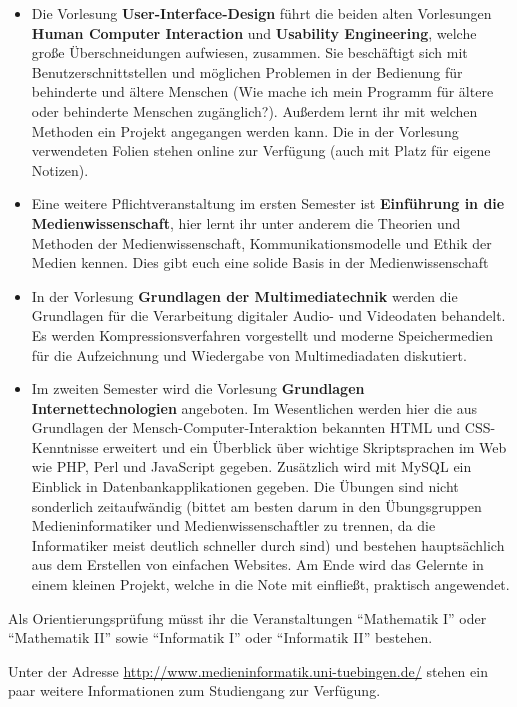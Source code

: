 \begin{itemize}

\item Die Vorlesung \textbf{User-Interface-Design} führt die beiden alten Vorlesungen \textbf{Human Computer Interaction} und \textbf{Usability Engineering}, welche große Überschneidungen aufwiesen, zusammen. Sie beschäftigt sich mit Benutzerschnittstellen und möglichen Problemen in der Bedienung für behinderte und ältere Menschen (Wie mache ich mein Programm für ältere oder behinderte Menschen zugänglich?). Außerdem lernt ihr mit welchen Methoden ein Projekt angegangen werden kann. Die in der Vorlesung verwendeten Folien stehen online zur Verfügung (auch mit Platz für eigene Notizen).

\item Eine weitere Pflichtveranstaltung im ersten Semester ist \textbf{Einführung in die Medienwissenschaft}, hier lernt ihr unter anderem die Theorien und Methoden der Medienwissenschaft, Kommunikationsmodelle und Ethik der Medien kennen. Dies gibt euch eine solide Basis in der Medienwissenschaft 

\item In der Vorlesung \textbf{Grundlagen der Multimediatechnik} werden die Grundlagen für die Verarbeitung digitaler Audio- und Videodaten behandelt. Es werden Kompressionsverfahren vorgestellt und moderne Speichermedien für die Aufzeichnung und Wiedergabe von Multimediadaten diskutiert.

\item Im zweiten Semester wird die Vorlesung \textbf{Grundlagen Internettechnologien} angeboten. Im Wesentlichen werden hier die aus Grundlagen der Mensch-Computer-Interaktion bekannten HTML und CSS-Kenntnisse erweitert und ein Überblick über wichtige Skriptsprachen im Web wie PHP, Perl und JavaScript gegeben. Zusätzlich wird mit MySQL ein Einblick in Datenbankapplikationen gegeben. Die Übungen sind nicht sonderlich zeitaufwändig (bittet am besten darum in den Übungsgruppen Medieninformatiker und Medienwissenschaftler zu trennen, da die Informatiker meist deutlich schneller durch sind) und bestehen hauptsächlich aus dem Erstellen von einfachen Websites. Am Ende wird das Gelernte in einem kleinen Projekt, welche in die Note mit einfließt, praktisch angewendet.

\end{itemize}

Als Orientierungsprüfung müsst ihr die Veranstaltungen "`Mathematik I"' oder "`Mathematik II"' sowie "`Informatik I"' oder "`Informatik II"' bestehen.



Unter der Adresse \url{http://www.medieninformatik.uni-tuebingen.de/} stehen ein paar weitere Informationen zum Studiengang zur Verfügung.
